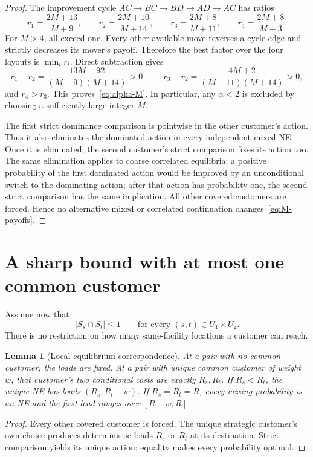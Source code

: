 \documentclass[11pt]{article}
\newtheorem{lemma}[theorem]{Lemma}
\theoremstyle{definition}
\theoremstyle{remark}
\newcommand{\Uone}{U_1}
\newcommand{\Utwo}{U_2}
\begin{document}
\begin{proof}
The improvement cycle $AC\to BC\to BD\to AD\to AC$ has ratios
\[
 r_1=\frac{2M+13}{M+9},\qquad
 r_2=\frac{2M+10}{M+14},\qquad
 r_3=\frac{2M+8}{M+11},\qquad
 r_4=\frac{2M+8}{M+3}.
\]
For $M>4$, all exceed one. Every other available move reverses a cycle edge and strictly decreases its mover's payoff. Therefore the best factor over the four layouts is $\min_i r_i$. Direct subtraction gives
\[
 r_1-r_2=\frac{13M+92}{(M+9)(M+14)}>0,\qquad
 r_3-r_2=\frac{4M+2}{(M+11)(M+14)}>0,
\]
and $r_4>r_3$. This proves~\eqref{eq:alpha-M}. In particular, any $\alpha<2$ is excluded by choosing a sufficiently large integer $M$.

The first strict dominance comparison is pointwise in the other customer's action. Thus it also eliminates the dominated action in every independent mixed NE. Once it is eliminated, the second customer's strict comparison fixes its action too. The same elimination applies to coarse correlated equilibria: a positive probability of the first dominated action would be improved by an unconditional switch to the dominating action; after that action has probability one, the second strict comparison has the same implication. All other covered customers are forced. Hence no alternative mixed or correlated continuation changes~\eqref{eq:M-payoffs}.
\end{proof}

\section{A sharp bound with at most one common customer}\label{sec:rho}

Assume now that
\begin{equation}\label{eq:single}
 |S_s\cap S_t|\le1\qquad
 \text{for every }(s,t)\in\Uone\times\Utwo.
\end{equation}
There is no restriction on how many same-facility locations a customer can reach.

\begin{lemma}[Local equilibrium correspondence]\label{lem:single}
At a pair with no common customer, the loads are fixed. At a pair with unique common customer of weight $w$, that customer's two conditional costs are exactly $R_s,R_t$. If $R_s<R_t$, the unique NE has loads $(R_s,R_t-w)$. If $R_s=R_t=R$, every mixing probability is an NE and the first load ranges over $[R-w,R]$.
\end{lemma}
\begin{proof}
Every other covered customer is forced. The unique strategic customer's own choice produces deterministic loads $R_s$ or $R_t$ at its destination. Strict comparison yields its unique action; equality makes every probability optimal.
\end{proof}
\end{document}
